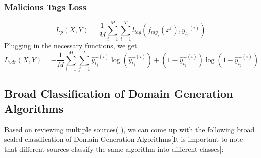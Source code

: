 \documentclass[conference]{IEEEtran}
\begin{document}
\subsubsection{Malicious Tags Loss}
\begin{equation}
  \label{eq:malicious_tag_loss}
  L_{p}(X,Y) = \frac{1}{M} \sum^{M}_{i=1}\sum^{T}_{i=1} l_{tag}(f_{tag_{j}}(x^{i}),{y_{t_{j}}}^{(i)}) 
\end{equation}
Plugging in the necessary functions, we get 
\begin{equation}
  \label{eq:malicious_tag_loss_long}
  L_{vdr}(X,Y)=-\frac{1}{M} \sum^{M}_{i=1}\sum^{T}_{j=1}\hat{y_{t_{j}}}^{(i)}\log{(\hat{y_{t_{j}}}^{(i)})}+(1-\hat{y_{t_{j}}}^{(i)})\log(1-\hat{y_{t_{j}}}^{(i)})
\end{equation}
\cite{b1}

\subsection{Broad Classification of Domain Generation Algorithms}
Based on reviewing multiple sources(\cite{b3} \cite{b9}\cite{b11}), we can come up with the following broad scaled classification of Domain Generation Algorithms[It is important to note that different sources classify the same algorithm into different classes]:
\end{document}
